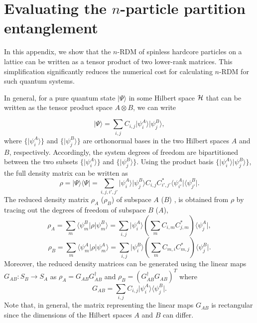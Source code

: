 \section{Evaluating the $n$-particle partition entanglement}

In this appendix, we show that the $n$-RDM of spinless hardcore particles on
a lattice can be written as a tensor product of two lower-rank matrices. This
simplification significantly reduces the numerical cost for calculating $n$-RDM
for such quantum systems. 

In general, for a pure quantum state $\vert \Psi\rangle$ in some
Hilbert space $\cal H$ that can be written as the tensor product space $A \otimes
B$, we can write

\begin{equation}
 \vert \Psi\rangle = \sum_{i,j} C_{i,j} \vert \psi^A_i\rangle  \vert \psi^B_j\rangle
\label{state_decomposition},
\end{equation}
where $\{\vert \psi^A_i\rangle\}$ and $\{\vert \psi^B_j\rangle\}$ are
orthonormal bases in the two Hilbert spaces $A$ and $B$, respectively.
Accordingly, the system degrees of freedom are bipartitioned between the two
subsets  $\{\vert \psi^A_i\rangle\}$ and $\{\vert \psi^B_j\rangle\}$. Using the
product basis $\{\vert \psi^A_i\rangle\vert  \psi^B_j\rangle\}$, the full
density matrix can be written as \begin{equation}
\rho=\vert \Psi\rangle\langle\Psi\vert = \sum_{i,j,i',j'}  \vert \psi^A_i\rangle  \vert \psi^B_j\rangle C_{i,j}C^*_{i',j'} \langle\psi^A_{i'}\vert \langle\psi^B_{j'}\vert 
\label{full_density_matrix}.
\end{equation}
The reduced density matrix $\rho_A$ ($\rho_B$) of subspace $A$ ($B$) , is obtained from $\rho$ by tracing out the degrees of freedom of subspace $B$ ($A$), 
\begin{equation}
\rho_A=\sum_{m}\langle\psi^B_m\vert \rho \vert \psi^B_m\rangle= \sum_{i,j}  \vert \psi^A_i\rangle \left(\sum_{m}C_{i,m}C^*_{j,m}\right) \langle\psi^A_{j}\vert 
\label{rho_1_full},
\end{equation}
\begin{equation}
\rho_B=\sum_{m}\langle\psi^A_m\vert \rho \vert \psi^A_m\rangle= \sum_{i,j}  \vert \psi^B_i\rangle \left(\sum_{m}C_{m,i}C^*_{m,j}\right) \langle\psi^B_{j}\vert 
\label{rho_2_full}.
\end{equation}
 Moreover,  the reduced density matrices can be generated using the linear maps $G_{AB}:S_B\rightarrow S_A$ as  $\rho_A=G_{AB}G_{AB}^\dagger$ and $\rho_B=(G_{AB}^\dagger G_{AB})^T$
where
\begin{equation}
G_{AB}=\sum_{i,j}C_{i,j}\vert \psi^A_i\rangle\langle\psi^B_j\vert 
\label{D_1}.
\end{equation}
Note that, in general, the matrix representing the linear maps $G_{AB}$ is
rectangular since the dimensions of the Hilbert spaces $A$ and $B$ can differ.


